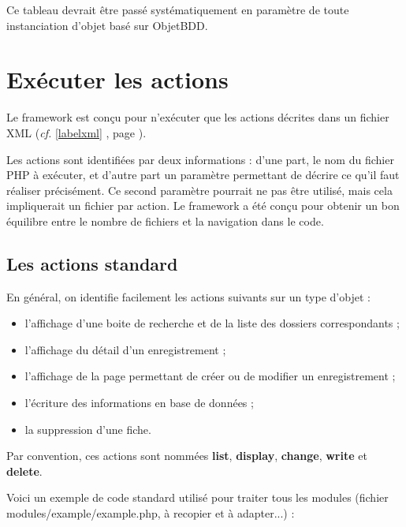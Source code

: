 Ce tableau devrait être passé systématiquement en paramètre de toute instanciation d'objet basé sur ObjetBDD.

\chapter{Exécuter les actions}
Le framework est conçu pour n'exécuter que les actions décrites dans un fichier XML (\textit{cf.} \ref{labelxml} \textit{}, page \pageref{labelxml}).

Les actions sont identifiées par deux informations : d'une part, le nom du fichier PHP à exécuter, et d'autre part un paramètre permettant de décrire ce qu'il faut réaliser précisément. Ce second paramètre pourrait ne pas être utilisé, mais cela impliquerait un fichier par action. 
Le framework a été conçu pour obtenir un bon équilibre entre le nombre de fichiers et la navigation dans le code.

\section{Les actions standard}

En général, on identifie facilement les actions suivants sur un type d'objet :
\begin{itemize}
\item l'affichage d'une boite de recherche et de la liste des dossiers correspondants ;
\item l'affichage du détail d'un enregistrement ;
\item l'affichage de la page permettant de créer ou de modifier un enregistrement ;
\item l'écriture des informations en base de données ;
\item la suppression d'une fiche.
\end{itemize}

Par convention, ces actions sont nommées \textbf{list}, \textbf{display}, \textbf{change}, \textbf{write} et \textbf{delete}. 

Voici un exemple de code standard utilisé pour traiter tous les modules (fichier modules/example/example.php, à recopier et à adapter...) :

